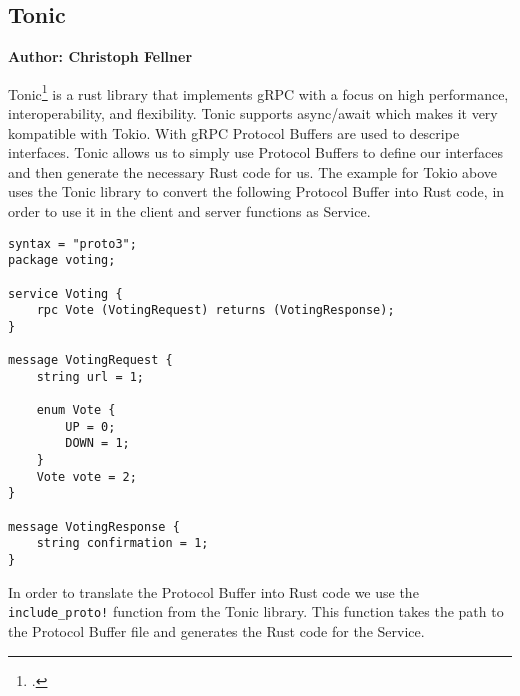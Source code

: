 \subsection{Tonic}
\textbf{Author: Christoph Fellner}

Tonic\footcite{tonic} is a rust library that implements gRPC with a focus on high performance, interoperability, and flexibility. Tonic supports async/await which makes it very kompatible 
with Tokio. With gRPC Protocol Buffers are used to descripe interfaces. Tonic allows us to simply use Protocol Buffers to define our interfaces and then generate the necessary
Rust code for us.
The example for Tokio above uses the Tonic library to convert the following Protocol Buffer into Rust code, in order to use it in the client and server functions as Service.

\begin{verbatim}
syntax = "proto3";
package voting;
        
service Voting {
    rpc Vote (VotingRequest) returns (VotingResponse);
}
        
message VotingRequest {
    string url = 1;
        
    enum Vote {
        UP = 0;
        DOWN = 1;
    }
    Vote vote = 2;    
}
        
message VotingResponse {
    string confirmation = 1;
}
\end{verbatim}

In order to translate the Protocol Buffer into Rust code we use the \verb+include_proto!+ function from the Tonic library. This function takes the path to the Protocol Buffer 
file and generates the Rust code for the Service.

\filbreak